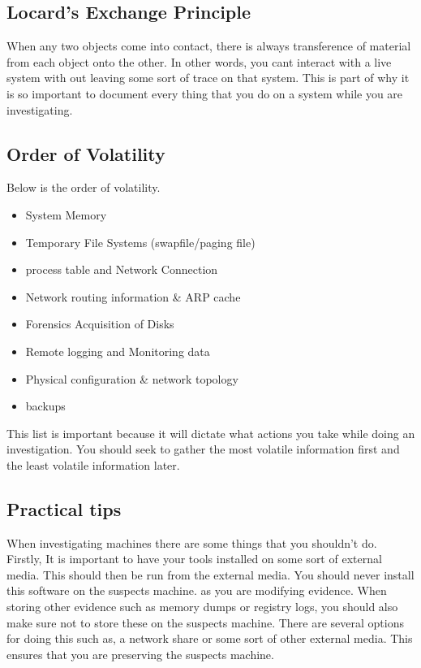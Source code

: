 \documentclass[letterpaper, onecolumn,10pt]{IEEEtran}
\begin{document}
            \subsection{Locard's Exchange Principle} When any two objects come into contact, there is always transference of material from each object onto the other. In other words, you cant interact with a live system with out leaving some sort of trace on that system. This is part of why it is so important to document every thing that you do on a system while you are investigating.
            
            \subsection{Order of Volatility} Below is the order of volatility.
            \begin{itemize}
                \item System Memory
                \item Temporary File Systems (swapfile/paging file)
                \item process table and Network Connection
                \item Network routing information & ARP cache
                \item Forensics Acquisition of Disks
                \item Remote logging and Monitoring data
                \item Physical configuration & network topology
                \item backups
            \end{itemize}
            This list is important because it will dictate what actions you take while doing an investigation. You should seek to gather the most volatile information first and the least volatile information later.\\
            
            \subsection{Practical tips} When investigating machines there are some things that you shouldn't do. Firstly, It is important to have your tools installed on some sort of external media. This should then be run from the external media. You should never install this software on the suspects machine. as you are modifying evidence. When storing other evidence such as memory dumps or registry logs, you should also make sure not to store these on the suspects machine. There are several options for doing this such as, a network share or some sort of other external media. This ensures that you are preserving the suspects machine.\\
		
\end{document}
